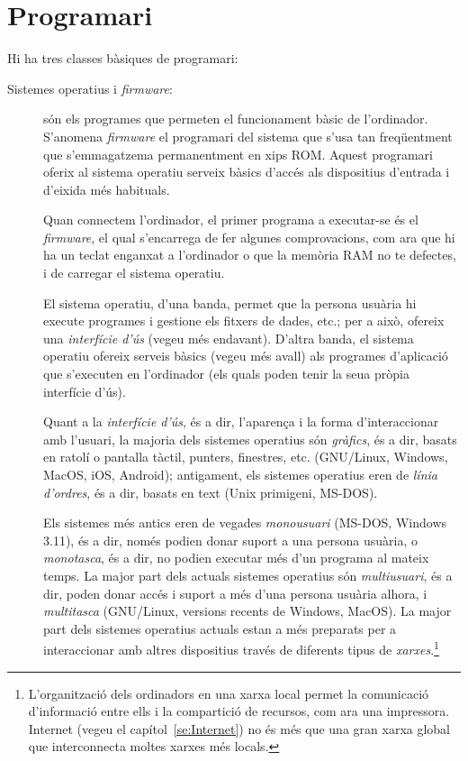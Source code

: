 \section{Programari}
\label{ss:programari}

Hi ha tres classes bàsiques de programari:

\begin{description}
\item[Sistemes operatius i \emph{firmware}:] són els programes que
  permeten el funcionament bàsic de l'ordinador. S'anomena
  \emph{firmware} el programari del sistema que s'usa tan freqüentment
  que s'emmagatzema permanentment en xips ROM. Aquest programari
  oferix al sistema operatiu serveix bàsics d'accés als dispositius
  d'entrada i d'eixida més habituals.

  Quan connectem l'ordinador, el primer programa a executar-se és el
  \emph{firmware}, el qual s'encarrega de fer algunes comprovacions,
  com ara que hi ha un teclat enganxat a l'ordinador o que la memòria
  RAM no te defectes, i de carregar el sistema operatiu.

  El sistema operatiu, d'una banda, permet que la persona usuària hi
  execute programes i gestione els fitxers de dades, etc.; per a això,
  ofereix una \emph{interfície d'ús} (vegeu més endavant). D'altra
  banda, el sistema operatiu ofereix serveis bàsics (vegeu més avall)
  als programes d'aplicació que s'executen en l'ordinador (els quals
  poden tenir la seua pròpia interfície d'ús).

  Quant a la \emph{interfície d'ús}, és a dir, l'aparença i la forma
  d'interaccionar amb l'usuari, la majoria dels sistemes operatius són
  \emph{gràfics}, és a dir, basats en ratolí o pantalla tàctil,
  punters, finestres, etc. (GNU/Linux, Windows, MacOS, iOS, Android);
  antigament, els sistemes operatius eren de {\em línia d'ordres}, és
  a dir, basats en text (Unix primigeni, MS-DOS).

  Els sistemes més antics eren de vegades \emph{monousuari} (MS-DOS,
  Windows 3.11), és a dir, només podien donar suport a una persona
  usuària, o \emph{monotasca}, és a dir, no podien executar més d'un
  programa al mateix temps. La major part dels actuals sistemes
  operatius són \emph{multiusuari}, és a dir, poden donar accés i
  suport a més d'una persona usuària alhora, i \emph{multitasca}
  (GNU/Linux, versions recents de Windows, MacOS). La major part dels
  sistemes operatius actuals estan a més preparats per a interaccionar
  amb altres dispositius través de diferents tipus de
  \emph{xarxes}.\footnote{L'organització dels ordinadors en una xarxa
    local permet la comunicació d'informació entre ells i la
    compartició de recursos, com ara una impressora. Internet (vegeu
    el capítol~\ref{se:Internet}) no és més que una gran xarxa global
    que interconnecta moltes xarxes més locals.}


\end{description}
